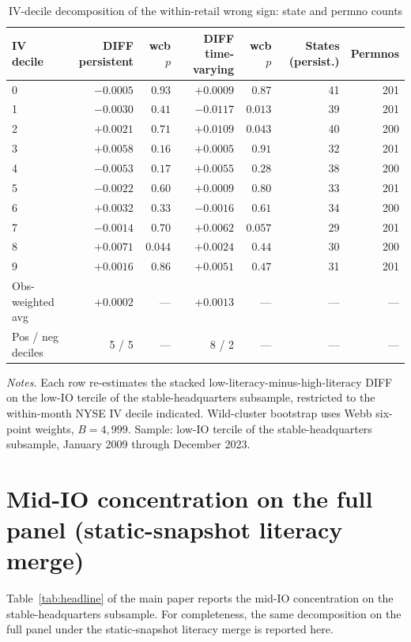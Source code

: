\documentclass[12pt]{article}
\begin{document}
\begin{table}[h]
\centering
\caption{IV-decile decomposition of the within-retail wrong sign: state and permno counts}
\footnotesize
\begin{tabular}{lrrrrrr}
\toprule
IV decile & DIFF persistent & wcb $p$ & DIFF time-varying & wcb $p$ & States (persist.) & Permnos \\
\midrule
0 & $-0.0005$ & $0.93$ & $+0.0009$ & $0.87$ & 41 & 201 \\
1 & $-0.0030$ & $0.41$ & $-0.0117$ & $0.013$ & 39 & 201 \\
2 & $+0.0021$ & $0.71$ & $+0.0109$ & $0.043$ & 40 & 200 \\
3 & $+0.0058$ & $0.16$ & $+0.0005$ & $0.91$ & 32 & 201 \\
4 & $-0.0053$ & $0.17$ & $+0.0055$ & $0.28$ & 38 & 200 \\
5 & $-0.0022$ & $0.60$ & $+0.0009$ & $0.80$ & 33 & 201 \\
6 & $+0.0032$ & $0.33$ & $-0.0016$ & $0.61$ & 34 & 200 \\
7 & $-0.0014$ & $0.70$ & $+0.0062$ & $0.057$ & 29 & 201 \\
8 & $+0.0071$ & $0.044$ & $+0.0024$ & $0.44$ & 30 & 200 \\
9 & $+0.0016$ & $0.86$ & $+0.0051$ & $0.47$ & 31 & 201 \\
\midrule
Obs-weighted avg & $+0.0002$ & --- & $+0.0013$ & --- & --- & --- \\
Pos / neg deciles & 5 / 5 & --- & 8 / 2 & --- & --- & --- \\
\bottomrule
\end{tabular}

\medskip
{\footnotesize\textit{Notes.} Each row re-estimates the stacked low-literacy-minus-high-literacy DIFF on the low-IO tercile of the stable-headquarters subsample, restricted to the within-month NYSE IV decile indicated. Wild-cluster bootstrap uses Webb six-point weights, $B = 4{,}999$. Sample: low-IO tercile of the stable-headquarters subsample, January 2009 through December 2023.}
\end{table}

\section{Mid-IO concentration on the full panel (static-snapshot literacy merge)}
\label{ia:fullpanelmidio}

Table~\ref{tab:headline} of the main paper reports the mid-IO concentration on the stable-headquarters subsample. For completeness, the same decomposition on the full panel under the static-snapshot literacy merge is reported here.
\end{document}
